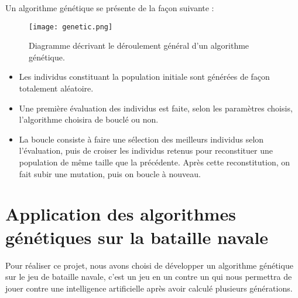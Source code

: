 \documentclass[12pt]{report}
\begin{document}
	\newpage
	Un algorithme génétique se présente de la façon suivante :\\
    \hspace{0pt}
    \begin{figure}[h]
    	\begin{center}
		\texttt{[image: genetic.png]}
		\caption{Diagramme décrivant le déroulement général d'un algorithme génétique.}
		\end{center}
	\end{figure}
	\begin{itemize}
	\itemsep0em 
	\item Les individus constituant la population initiale sont générées de façon totalement aléatoire.\\
	\item Une première évaluation des individus est faite, selon les paramètres choisis, l'algorithme choisira de bouclé ou non.\\
	\item La boucle consiste à faire une sélection des meilleurs individus selon l'évaluation, 
	puis de croiser les individus retenus pour reconstituer une population de même taille que la précédente. Après cette reconstitution, on fait subir une mutation, puis on boucle à nouveau.
	\end{itemize}
	
\newpage
{}
\section{Application des algorithmes génétiques sur la bataille navale}
	Pour réaliser ce projet, nous avons choisi de développer un algorithme génétique sur le jeu de bataille navale, c'est un jeu en un contre un qui nous permettra de jouer contre une intelligence artificielle après avoir calculé plusieurs générations.
\end{document}
